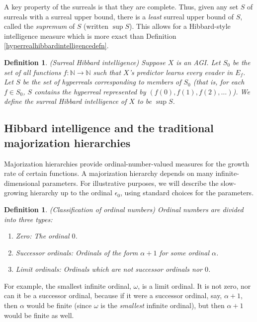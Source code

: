 \documentclass{article}
\newtheorem{definition}[theorem]{Definition}
\begin{document}
A key property of the surreals
is that they are complete. Thus, given any set $S$ of surreals with a surreal upper bound,
there is a \emph{least} surreal upper bound of $S$, called the \emph{supremum} of $S$
(written $\sup S$). This allows for a Hibbard-style intelligence measure which is more
exact than Definition \ref{hyperrealhibbardintelligencedefn}.

\begin{definition}
\label{surrealhibbardintelligencedefn}
    (Surreal Hibbard intelligence)
    Suppose $X$ is an AGI. Let $S_0$ be the set of all functions $f:\mathbb N\to\mathbb N$
    such that $X$'s predictor learns every evader in $E_f$.
    Let $S$ be the set of hyperreals corresponding to members of $S_0$ (that is,
    for each $f\in S_0$, $S$ contains the hyperreal represented by $(f(0),f(1),f(2),\ldots)$).
    We define the \emph{surreal Hibbard intelligence} of $X$ to be
    $\sup S$.
\end{definition}

\subsection{Hibbard intelligence and the traditional majorization hierarchies}

Majorization hierarchies \cite{weiermann2002slow}
provide ordinal-number-valued measures for the growth
rate of certain functions. A majorization hierarchy depends
on many infinite-dimensional parameters. For illustrative purposes,
we will describe the slow-growing hierarchy up to the ordinal $\epsilon_0$,
using standard choices for the parameters.

\begin{definition}
    (Classification of ordinal numbers)
    Ordinal numbers are divided into three types:
    \begin{enumerate}
        \item Zero: The ordinal $0$.
        \item Successor ordinals: Ordinals of the form $\alpha+1$ for some ordinal $\alpha$.
        \item Limit ordinals: Ordinals which are not successor ordinals nor $0$.
    \end{enumerate}
\end{definition}

For example, the smallest infinite ordinal, $\omega$, is a limit ordinal. It is not zero,
nor can it be a successor ordinal, because if it were a successor ordinal, say, $\alpha+1$,
then $\alpha$ would be finite (since $\omega$ is the \emph{smallest} infinite ordinal),
but then $\alpha+1$ would be finite as well.
\end{document}
